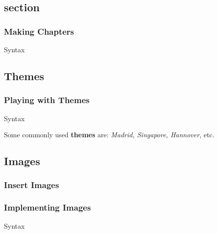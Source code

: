 \documentclass{beamer}
\begin{document}
            \subsection{section}
                \begin{frame}[shrink]
                \frametitle{Making Chapters}
                \transwipe
                    \begin{block}{Syntax}
                        
                    \end{block}
                \end{frame}

            \subsection{Themes}
                \begin{frame}[shrink]
                \frametitle{Playing with Themes}
                \transboxout
                    \begin{block}{Syntax}
                        
                    \end{block}
                   {\color{white}Some commonly used \textbf{themes} are: \textit{Madrid, Singapore, Hannover}, etc.}
                \end{frame}

            \subsection{Images}
            \subsubsection{Insert Images}
                \begin{frame}[shrink]
                \frametitle{Implementing Images}
                \transboxin
                    \begin{block}{Syntax}
                        
                    \end{block}
                \end{frame}
\end{document}
